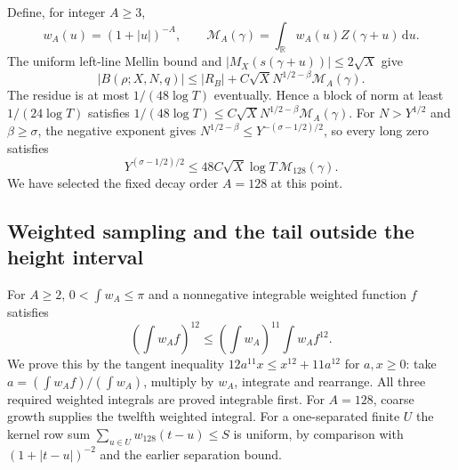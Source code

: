 \documentclass[11pt,a4paper]{article}
\numberwithin{equation}{section}
\theoremstyle{definition}
\newcommand{\R}{\mathbb R}
\newcommand{\dd}{\,\mathrm d}
\newcommand{\zabs}{Z}
\begin{document}
Define, for integer $A\ge3$,
\[
 w_A(u)=(1+|u|)^{-A},\qquad
 \mathcal M_A(\gamma)=\int_{\R}w_A(u)\zabs(\gamma+u)\dd u.
\]
The uniform left-line Mellin bound and $|M_X(s(\gamma+u))|\le2\sqrt X$
give
\[
 |B(\rho;X,N,q)|\le|R_B|+C\sqrt XN^{1/2-\beta}\mathcal M_A(\gamma).
\]
The residue is at most $1/(48\log T)$ eventually. Hence a block of norm at
least $1/(24\log T)$ satisfies
$1/(48\log T)\le C\sqrt XN^{1/2-\beta}\mathcal M_A(\gamma)$.
For $N>Y^{1/2}$ and $\beta\ge\sigma$, the negative exponent gives
$N^{1/2-\beta}\le Y^{-(\sigma-1/2)/2}$, so every long zero satisfies
\begin{equation}\label{eq:longmean}
 Y^{(\sigma-1/2)/2}\le48C\sqrt X\log T\,\mathcal M_{128}(\gamma).
\end{equation}
We have selected the fixed decay order $A=128$ at this point.

\subsection{Weighted sampling and the tail outside the height interval}
For $A\ge2$, $0<\int w_A\le\pi$ and a nonnegative integrable weighted
function $f$ satisfies
\[
 \left(\int w_A f\right)^{12}\le\left(\int w_A\right)^{11}
                                      \int w_A f^{12}.
\]
We prove this by the tangent inequality
$12a^{11}x\le x^{12}+11a^{12}$ for $a,x\ge0$: take
$a=(\int w_Af)/(\int w_A)$, multiply by $w_A$, integrate and rearrange.
All three required weighted integrals are proved integrable first. For
$A=128$, coarse growth supplies the twelfth weighted integral.
For a one-separated finite $U$ the kernel row sum
$\sum_{u\in U}w_{128}(t-u)\le S$ is uniform, by comparison with
$(1+|t-u|)^{-2}$ and the earlier separation bound.
\end{document}
